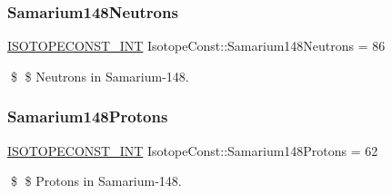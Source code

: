 \subsubsection{\texorpdfstring{Samarium148\+Neutrons}{Samarium148Neutrons}}
{\footnotesize\ttfamily \mbox{\hyperlink{group___isotope_const-_macros_ga5f18360b3e99483a35c32d789e62621c}{I\+S\+O\+T\+O\+P\+E\+C\+O\+N\+S\+T\+\_\+\+I\+NT}} Isotope\+Const\+::\+Samarium148\+Neutrons = 86}

\$ \$ Neutrons in Samarium-\/148. \mbox{\label{group___isotope_const-_samarium-_sm148_gac87c7565b5eda8492e615029c2e68ff4}} 
\subsubsection{\texorpdfstring{Samarium148\+Protons}{Samarium148Protons}}
{\footnotesize\ttfamily \mbox{\hyperlink{group___isotope_const-_macros_ga5f18360b3e99483a35c32d789e62621c}{I\+S\+O\+T\+O\+P\+E\+C\+O\+N\+S\+T\+\_\+\+I\+NT}} Isotope\+Const\+::\+Samarium148\+Protons = 62}

\$ \$ Protons in Samarium-\/148. 